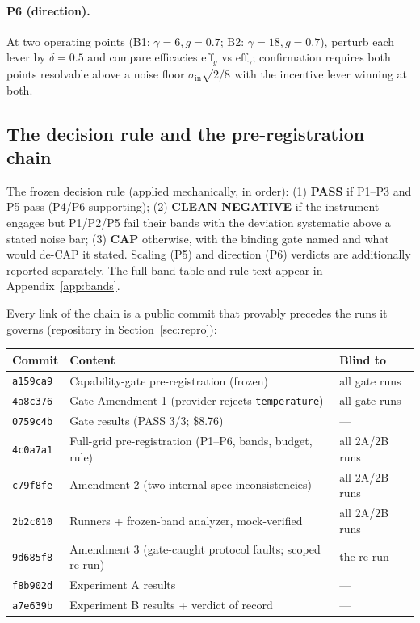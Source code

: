 \documentclass{article} %
\begin{document}
\paragraph{P6 (direction).} At two operating points (B1: $\gamma = 6, g = 0.7$; B2: $\gamma = 18, g = 0.7$), perturb each lever by $\delta = 0.5$ and compare efficacies $\mathrm{eff}_g$ vs $\mathrm{eff}_\gamma$; confirmation requires both points resolvable above a noise floor $\sigma_{\mathrm{in}}\sqrt{2/8}$ with the incentive lever winning at both.

\subsection{The decision rule and the pre-registration chain}
\label{sec:chain}

The frozen decision rule (applied mechanically, in order): (1) \textbf{PASS} if P1--P3 and P5 pass (P4/P6 supporting); (2) \textbf{CLEAN NEGATIVE} if the instrument engages but P1/P2/P5 fail their bands with the deviation systematic above a stated noise bar; (3) \textbf{CAP} otherwise, with the binding gate named and what would de-CAP it stated. Scaling (P5) and direction (P6) verdicts are additionally reported separately. The full band table and rule text appear in Appendix~\ref{app:bands}.

Every link of the chain is a public commit that provably precedes the runs it governs (repository in Section~\ref{sec:repro}):
\begin{center}
\small
\begin{tabular}{@{}lll@{}}
\toprule
Commit & Content & Blind to \\
\midrule
\texttt{a159ca9} & Capability-gate pre-registration (frozen) & all gate runs \\
\texttt{4a8c376} & Gate Amendment 1 (provider rejects \texttt{temperature}) & all gate runs \\
\texttt{0759c4b} & Gate results (PASS 3/3; \$8.76) & --- \\
\texttt{4c0a7a1} & Full-grid pre-registration (P1--P6, bands, budget, rule) & all 2A/2B runs \\
\texttt{c79f8fe} & Amendment 2 (two internal spec inconsistencies) & all 2A/2B runs \\
\texttt{2b2c010} & Runners + frozen-band analyzer, mock-verified & all 2A/2B runs \\
\texttt{9d685f8} & Amendment 3 (gate-caught protocol faults; scoped re-run) & the re-run \\
\texttt{f8b902d} & Experiment A results & --- \\
\texttt{a7e639b} & Experiment B results + verdict of record & --- \\
\bottomrule
\end{tabular}
\end{center}
\end{document}
